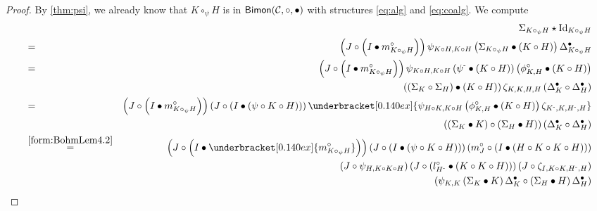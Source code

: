 \documentclass[nosumlimits,twoside]{amsart}
\theoremstyle{definition}
\theoremstyle{remark}
\def\revsn{\text{-}}
\newcommand{\Cc}{\mathcal{C}}
\def\Bimon{{\sf Bimon}}
\begin{document}
\begin{proof}
By \cref{thm:psi}, we already know that $K\circ_{\psi}H$ is in $\Bimon(\Cc,\circ,\bullet)$ with structures \eqref{eq:alg} and \eqref{eq:coalg}. We compute
\begin{eqnarray*}
&&\Sigma _{K\circ _{\psi }H}\star \mathrm{Id}_{K\circ _{\psi }H} \\
&=&\left( J\circ \left( I\bullet m_{K\circ _{\psi }H}^{\circ }\right)
\right) \psi _{K\circ H,K\circ H}\left( \Sigma _{K\circ _{\psi }H}\bullet
\left( K\circ H\right) \right) \Delta _{K\circ _{\psi }H}^{\bullet } \\
&=&
\left( J\circ \left( I\bullet m_{K\circ _{\psi }H}^{\circ }\right) \right)
\psi _{K\circ H,K\circ H}\left( \psi ^{\revsn}\bullet \left( K\circ H\right)
\right) \left( \phi _{K,H}^{\circ }\bullet \left( K\circ H\right) \right)
\\
&&\left( \left( \Sigma _{K}\circ \Sigma _{H}\right) \bullet \left( K\circ
H\right) \right) \zeta _{K,K,H,H}\left( \Delta _{K}^{\bullet }\circ \Delta
_{H}^{\bullet }\right)\\
&=&
\left( J\circ \left( I\bullet m_{K\circ _{\psi }H}^{\circ }\right) \right)
\left( J\circ \left( I\bullet \left( \psi \circ K\circ H\right) \right)
\right) \underbracket[0.140ex]{\psi _{H\circ K,K\circ H}\left( \phi
_{K,H}^{\circ }\bullet \left( K\circ H\right) \right) \zeta _{K^{\revsn
},K,H^{\revsn },H}} \\
&&\left( \left( \Sigma _{K}\bullet K\right) \circ \left( \Sigma _{H}\bullet
H\right) \right) \left( \Delta _{K}^{\bullet }\circ \Delta _{H}^{\bullet
}\right)\\
&\overset{\eqref{form:BohmLem4.2}}{=}&
\left( J\circ \left( I\bullet \underbracket[0.140ex]{m_{K\circ _{\psi }H}^{\circ }}\right) \right)
\left( J\circ \left( I\bullet \left( \psi \circ K\circ H\right) \right)
\right) \left( m_{J}^{\circ }\circ \left( I\bullet \left( H\circ K\circ
K\circ H\right) \right) \right)  \\
&&\left( J\circ \psi _{H,K\circ K\circ H}\right) \left( J\circ \left( l_{H^{%
\revsn}}^{\circ }\bullet \left( K\circ K\circ H\right) \right) \right)
\left( J\circ \zeta _{I,K\circ K,H^{\revsn},H}\right)  \\
&&\left( \psi _{K,K}\left( \Sigma _{K}\bullet K\right) \Delta _{K}^{\bullet
}\circ \left( \Sigma _{H}\bullet H\right) \Delta _{H}^{\bullet }\right)\\

\end{eqnarray*}
\end{proof}
\end{document}
